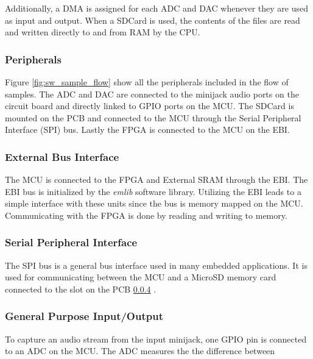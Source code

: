 
Additionally, a DMA is assigned for each ADC and DAC whenever they are used as
input and output. When a SDCard is used, the contents of the files are read and
written directly to and from RAM by the CPU.

\subsubsection{Peripherals}



Figure \ref{fig:sw_sample_flow} show all the peripherals included in the flow of samples.
The ADC and DAC are connected to the minijack audio ports on the circuit board and directly
linked to GPIO ports on the MCU. The SDCard
is mounted on the PCB and connected to the MCU through the Serial Peripheral Interface (SPI)
bus. Lastly the FPGA is connected to the MCU on the EBI.

\subsubsection{External Bus Interface}
The MCU is connected to the FPGA and External SRAM through the EBI. The EBI bus
is initialized by the {\it emlib} software library. Utilizing
the EBI leads to a simple interface with these units since the bus is memory
mapped on the MCU. Communicating with the FPGA is done by reading and writing to memory.

\subsubsection{Serial Peripheral Interface}
The SPI bus is a general bus interface used in many embedded applications. It is used
for communicating between the MCU and a MicroSD memory card connected to the slot
on the PCB \ref{} .

\subsubsection{General Purpose Input/Output}
To capture an audio stream from the input minijack, one GPIO pin is connected to an
ADC on the MCU. The ADC measures the the difference between


